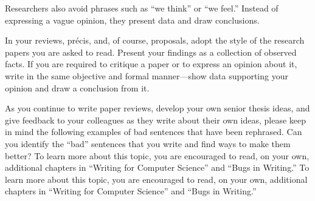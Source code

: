 Researchers also avoid phrases such as ``we think'' or ``we feel.'' Instead
of expressing a vague opinion, they present data and draw conclusions.

In your reviews, pr\'{e}cis, and, of course, proposals, adopt the style of
the research papers you are asked to read. Present your findings as a
collection of observed facts. If you are required to critique a paper
or to express an opinion about it, write in the same objective and formal
manner---show data supporting your opinion and draw a conclusion from it.

As you continue to write paper reviews, develop your own senior thesis ideas, and give feedback to your colleagues as
they write about their own ideas, please keep in mind the following examples of bad sentences that have been rephrased.
Can you identify the ``bad'' sentences that you write and find ways to make them better? To learn more about this topic,
you are encouraged to read, on your own, additional chapters in ``Writing for Computer Science'' and ``Bugs in
Writing.'' To learn more about this topic, you are encouraged to read, on your own, additional chapters in ``Writing for
Computer Science'' and ``Bugs in Writing.''

